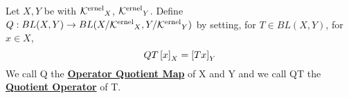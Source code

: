 \label{def:quotientoperator}
\newcommand{\QuotientOperator}[0]{\textbf{\hyperref[def:quotientoperator]{Quotient Operator}}\xspace}
\newcommand{\OperatorQuotientMap}[0]{\textbf{\hyperref[def:quotientoperator]{Operator Quotient Map}}\xspace}
\begin{df}
    Let $X,Y$ be \SeminormedSpaces
    with \SeminormKernels $\textbf{\ensuremath{\mathcal{K}\rm^{ernel}}}_X$, $\textbf{\ensuremath{\mathcal{K}\rm^{ernel}}}_Y$. 
    Define $Q:BL(X,Y) \to BL(X/\textbf{\ensuremath{\mathcal{K}\rm^{ernel}}}_X, Y/\textbf{\ensuremath{\mathcal{K}\rm^{ernel}}}_Y)$ by 
    setting, for $T \in BL(X,Y)$, 
    for $x \in X$, 
    \begin{equation}
    QT\left[ x \right]_X=\left[ Tx \right]_Y
    \end{equation}
    We call Q the \OperatorQuotientMap of X and Y and
    we call QT the \QuotientOperator of T. 
\end{df}


